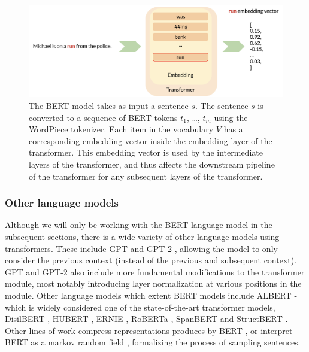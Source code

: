 \documentclass[a4paper,12pt,oneside,openright]{report}
\begin{document}
\begin{figure}[h]
	\center
  \includegraphics[width=\linewidth]{./assets/experiments/pipeline_vanilla_BERT.png}
  \caption{The BERT model takes as input a sentence $s$. The sentence $s$ is converted to a sequence of BERT tokens $t_1$, \ldots, $t_m$ using the WordPiece tokenizer.
Each item in the vocabulary $V$ has a corresponding embedding vector inside the embedding layer of the transformer.
This embedding vector is used by the intermediate layers of the transformer, and thus affects the downstream pipeline of the transformer for any subsequent layers of the transformer.
}
  \label{fig:BERT_vanilla_pipeline}
\end{figure}


\subsubsection{Other language models}

Although we will only be working with the BERT language model in the subsequent sections, there is a wide variety of other language models using transformers.
These include GPT \cite{radford18} and GPT-2 \cite{radford19}, allowing the model to only consider the previous context (instead of the previous and subsequent context).
GPT and GPT-2 also include more fundamental modifications to the transformer module, most notably introducing layer normalization \cite{ba16} at various positions in the module. 
Other language models which extent BERT models include ALBERT \cite{lan20} - which is widely considered one of the state-of-the-art transformer models, DisilBERT \cite{sanh19}, HUBERT \cite{moradshahi19}, ERNIE \cite{sun19}, RoBERTa \cite{liu19}, SpanBERT \cite{joshi19} and StructBERT \cite{wang19d}.
Other lines of work compress representations produces by BERT \cite{shen19}, or interpret BERT as a markov random field \cite{wang19e}, formalizing the process of sampling sentences.
\end{document}
